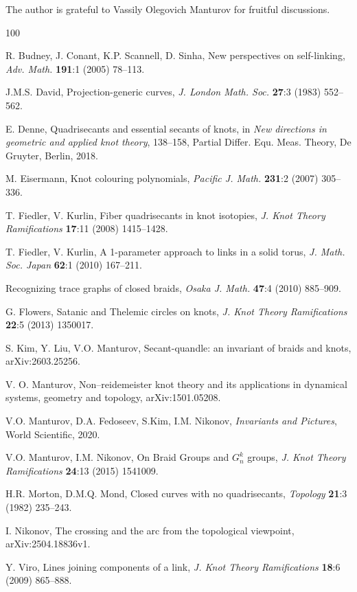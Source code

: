 \documentclass{article}
\theoremstyle{definition}
\theoremstyle{remark}
\begin{document}
The author is grateful to Vassily Olegovich Manturov for fruitful discussions.



\begin{thebibliography}{100}

 R. Budney, J. Conant, K.P. Scannell, D. Sinha, New perspectives on self-linking, \emph{Adv. Math.} {\bf 191}:1 (2005) 78--113.

 J.M.S. David, Projection-generic curves, \emph{J. London Math. Soc.} {\bf 27}:3 (1983) 552--562.

 E. Denne, Quadrisecants and essential secants of knots, in {\it New directions in geometric and applied knot theory}, 138--158, Partial Differ. Equ. Meas. Theory, De Gruyter, Berlin, 2018.

 M. Eisermann, Knot colouring polynomials, \emph{Pacific J. Math.} {\bf 231}:2 (2007) 305--336.

 T. Fiedler, V. Kurlin, Fiber quadrisecants in knot isotopies, \emph{J. Knot Theory Ramifications} {\bf 17}:11 (2008) 1415--1428.

 T. Fiedler, V. Kurlin, A 1-parameter approach to links in a solid torus, \emph{J. Math. Soc. Japan} {\bf 62}:1 (2010) 167--211.

 Recognizing trace graphs of closed braids, \emph{Osaka J. Math.} {\bf 47}:4 (2010) 885--909.

 G. Flowers, Satanic and Thelemic circles on knots, \emph{J. Knot Theory Ramifications} {\bf 22}:5 (2013) 1350017.

 S. Kim, Y. Liu, V.O. Manturov, Secant-quandle: an invariant of braids and knots, 	arXiv:2603.25256.

 V. O. Manturov, Non–reidemeister knot theory and its applications in dynamical systems, geometry and topology, arXiv:1501.05208.

 V.O. Manturov, D.A. Fedoseev, S.Kim, I.M. Nikonov, \emph{Invariants and Pictures}, World Scientific, 2020.

 V.O. Manturov, I.M. Nikonov, On Braid Groups and $G^k_n$ groups, \emph{J. Knot Theory Ramifications} {\bf 24}:13 (2015) 1541009.

 H.R. Morton, D.M.Q. Mond, Closed curves with no quadrisecants, \emph{Topology} {\bf 21}:3 (1982) 235--243.

 I. Nikonov, The crossing and the arc from the topological viewpoint, 	arXiv:2504.18836v1.

 Y. Viro, Lines joining components of a link, \emph{J. Knot Theory Ramifications} {\bf 18}:6 (2009) 865--888.

\end{thebibliography}
\end{document}
